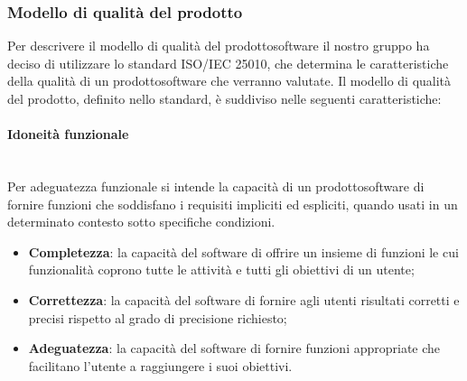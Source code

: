 \subsubsection{Modello di qualità del prodotto} 
Per descrivere il modello di qualità del prodotto\glosp software il nostro gruppo ha deciso di utilizzare lo standard ISO/IEC 25010, che determina le caratteristiche della qualità di un prodotto\glosp software che verranno valutate. Il modello di qualità del prodotto\glo, definito nello standard, è suddiviso nelle seguenti caratteristiche:
	\paragraph{Idoneità funzionale} \mbox{}\\
	Per adeguatezza funzionale si intende la capacità di un prodotto\glosp software di fornire funzioni che soddisfano i requisiti impliciti ed espliciti, quando usati in un determinato contesto sotto specifiche condizioni.
	\begin{itemize}
		\item \textbf{Completezza}: la capacità del software di offrire un insieme di funzioni le cui funzionalità coprono tutte le attività e tutti gli obiettivi di un utente;
		\item \textbf{Correttezza}: la capacità del software di fornire agli utenti risultati corretti e precisi rispetto al grado di precisione richiesto;
		\item \textbf{Adeguatezza}: la capacità del software di fornire funzioni appropriate che facilitano l'utente a raggiungere i suoi obiettivi.
	\end{itemize}
